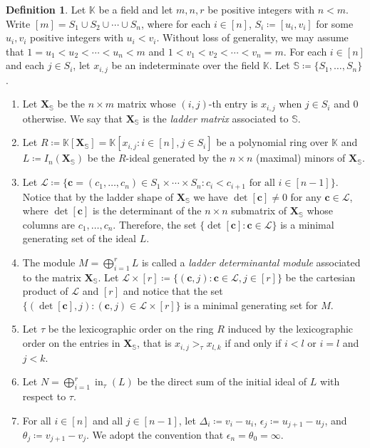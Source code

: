 \documentclass[11pt,a4paper,reqno,dvipsnames]{amsart}
\theoremstyle{plain}
\theoremstyle{definition}
\newtheorem{Assumptions and Discussion}[Theorem]{Assumptions and Discussion}
\newtheorem{Definition}[Theorem]{Definition}
\theoremstyle{remark}
\def\ini{\operatorname{in}}
\def\KK{{\mathbb K}}
\newcommand\bdc{{\bm c}}
\newcommand\bdX{{\bm X}}
\newcommand\bfX{\mathbf{X}}
\newcommand\bfS{\mathbb{S}}
\newcommand\calL{\mathcal{L}}
\newcommand{\Lr}{\ensuremath{\calL\times[r]}}
\begin{document}
\begin{Definition}
    \label{def:Ladder} 
    Let $\KK$ be a field and let $m,n,r$ be positive integers with $n<m$.  Write $[m]=S_1 \cup S_2 \cup \cdots \cup S_n$, where for each $i\in [n]$, $S_i\coloneqq [u_i, v_i]$ for some $u_i, v_i$ positive integers with $u_i < v_i$.  Without loss of generality, we may assume that $1=u_1<  u_2 <  \cdots <  u_n < m$ and $1< v_1<  v_2 < \cdots < v_n=m$.
     For each $i\in [n]$ and each $j\in S_i$, let $x_{i,j}$ be an indeterminate over the field $\KK$. Let $\bfS \coloneq \{S_1, \ldots, S_n\}$.


    \begin{enumerate}[a]
   \item    Let  $\bfX_{\bfS}$ be the $n\times m$ matrix whose $(i,j)$-th entry is $x_{i,j}$ when $j\in S_i$ and $0$ otherwise.  We say that $\bfX_{\bfS}$ is the \emph{ladder matrix} associated to $\bfS$. 
    \item Let $R\coloneq\KK[\bfX_{\bfS}]=\KK[x_{i,j}: i\in[n], j\in S_i]$ be a polynomial ring over $\KK$ and $L\coloneq I_n(\bfX_{\bfS})$ be the $R$-ideal generated by the $n\times n$ (maximal) minors of $\bfX_{\bfS}$. 
     \item Let  $\calL\coloneqq \{\bdc=(c_1, \ldots, c_n)\in S_1\times \cdots \times S_n : c_i<c_{i+1} \mbox{ for all } i\in [n-1]\}$. Notice that by the ladder shape of $\bdX_{\bfS}$ we have  $\det[\bdc]\neq 0$ for any $\bdc\in \calL$, where  $\det[\bdc]$ is the determinant of the $n\times n$ submatrix of $\bfX_{\bfS}$ whose columns are $c_1, \ldots, c_n$.  Therefore, the set $\{ \det[\bdc] : \bdc\in \calL\}$ is a minimal generating set of the ideal $L$.
     
     \item The module $M=\bigoplus_{i=1}^rL$ is called a \emph{ladder determinantal module} associated to the matrix $\bfX_{\bfS}$. Let $\calL\times [r]  \coloneqq \{(\bdc, j) : \bdc\in \calL, j\in [r]\}$ be the cartesian product of $\calL$ and $[r]$ and notice that the set $\{(\det[\bdc], j): (\bdc, j)\in \Lr\}$ is a minimal generating set for $M$.
     \item Let $\tau$ be the lexicographic order on the ring $R$ induced by the lexicographic order on the entries in $\bfX_{\bfS}$, that is $x_{i,j}>_{\tau}x_{l,k}$ if and only if $i<l$ or $i=l$ and $j<k$.
     \item Let $N=\bigoplus_{i=1}^r \ini_{\tau}(L)$ be the direct sum of the initial ideal of $L$ with respect to $\tau$.
     \item For all $i\in[n]$ and all $j\in [n-1]$, let $\Delta_i\coloneq v_i-u_i$, $\epsilon_j\coloneq u_{j+1}-u_j$, and  $\theta_j\coloneq v_{j+1}-v_j$. We adopt the convention that $\epsilon_n = \theta_0=\infty$.
\end{enumerate}
\end{Definition}
\end{document}
